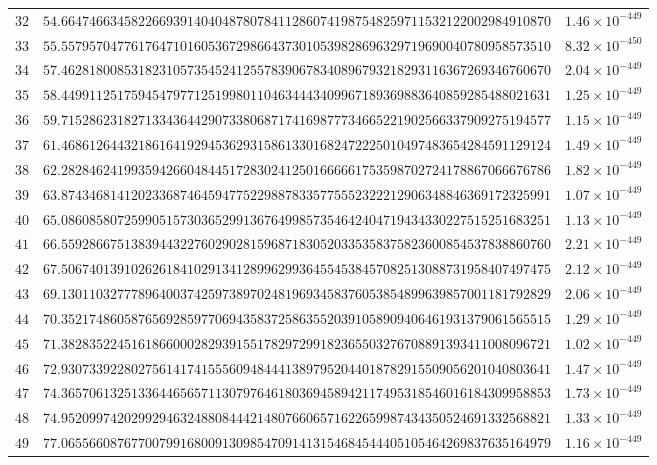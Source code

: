 \documentclass[12pt,reqno]{amsart}
\theoremstyle{remark}
\begin{document}
\begin{longtable}{clc}
$32$ & $54.6647466345822669391404048780784112860741987548259711532122002984910870$ & $1.46\times 10^{-449}$ \\
$33$ & $55.5579570477617647101605367298664373010539828696329719690040780958573510$ & $8.32\times 10^{-450}$ \\
$34$ & $57.4628180085318231057354524125578390678340896793218293116367269346760670$ & $2.04\times 10^{-449}$ \\
$35$ & $58.4499112517594547977125199801104634443409967189369883640859285488021631$ & $1.25\times 10^{-449}$ \\
$36$ & $59.7152862318271334364429073380687174169877734665221902566337909275194577$ & $1.15\times 10^{-449}$ \\
$37$ & $61.4686126443218616419294536293158613301682472225010497483654284591129124$ & $1.49\times 10^{-449}$ \\
$38$ & $62.2828462419935942660484451728302412501666661753598702724178867066676786$ & $1.82\times 10^{-449}$ \\
$39$ & $63.8743468141202336874645947752298878335775552322212906348846369172325991$ & $1.07\times 10^{-449}$ \\
$40$ & $65.0860858072599051573036529913676499857354642404719434330227515251683251$ & $1.13\times 10^{-449}$ \\
$41$ & $66.5592866751383944322760290281596871830520335358375823600854537838860760$ & $2.21\times 10^{-449}$ \\
$42$ & $67.5067401391026261841029134128996299364554538457082513088731958407497475$ & $2.12\times 10^{-449}$ \\
$43$ & $69.1301103277789640037425973897024819693458376053854899639857001181792829$ & $2.06\times 10^{-449}$ \\
$44$ & $70.3521748605876569285977069435837258635520391058909406461931379061565515$ & $1.29\times 10^{-449}$ \\
$45$ & $71.3828352245161866000282939155178297299182365503276708891393411008096721$ & $1.02\times 10^{-449}$ \\
$46$ & $72.9307339228027561417415556094844413897952044018782915509056201040803641$ & $1.47\times 10^{-449}$ \\
$47$ & $74.3657061325133644656571130797646180369458942117495318546016184309958853$ & $1.73\times 10^{-449}$ \\
$48$ & $74.9520997420299294632488084442148076606571622659987434350524691332568821$ & $1.33\times 10^{-449}$ \\
$49$ & $77.0655660876770079916800913098547091413154684544405105464269837635164979$ & $1.16\times 10^{-449}$ \\

\end{longtable}
\end{document}
